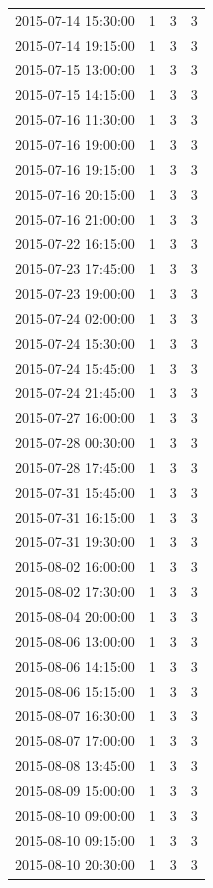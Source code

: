 \begin{tabular}{lrrr}
2015-07-14 15:30:00 & 1 & 3 & 3 \\
2015-07-14 19:15:00 & 1 & 3 & 3 \\
2015-07-15 13:00:00 & 1 & 3 & 3 \\
2015-07-15 14:15:00 & 1 & 3 & 3 \\
2015-07-16 11:30:00 & 1 & 3 & 3 \\
2015-07-16 19:00:00 & 1 & 3 & 3 \\
2015-07-16 19:15:00 & 1 & 3 & 3 \\
2015-07-16 20:15:00 & 1 & 3 & 3 \\
2015-07-16 21:00:00 & 1 & 3 & 3 \\
2015-07-22 16:15:00 & 1 & 3 & 3 \\
2015-07-23 17:45:00 & 1 & 3 & 3 \\
2015-07-23 19:00:00 & 1 & 3 & 3 \\
2015-07-24 02:00:00 & 1 & 3 & 3 \\
2015-07-24 15:30:00 & 1 & 3 & 3 \\
2015-07-24 15:45:00 & 1 & 3 & 3 \\
2015-07-24 21:45:00 & 1 & 3 & 3 \\
2015-07-27 16:00:00 & 1 & 3 & 3 \\
2015-07-28 00:30:00 & 1 & 3 & 3 \\
2015-07-28 17:45:00 & 1 & 3 & 3 \\
2015-07-31 15:45:00 & 1 & 3 & 3 \\
2015-07-31 16:15:00 & 1 & 3 & 3 \\
2015-07-31 19:30:00 & 1 & 3 & 3 \\
2015-08-02 16:00:00 & 1 & 3 & 3 \\
2015-08-02 17:30:00 & 1 & 3 & 3 \\
2015-08-04 20:00:00 & 1 & 3 & 3 \\
2015-08-06 13:00:00 & 1 & 3 & 3 \\
2015-08-06 14:15:00 & 1 & 3 & 3 \\
2015-08-06 15:15:00 & 1 & 3 & 3 \\
2015-08-07 16:30:00 & 1 & 3 & 3 \\
2015-08-07 17:00:00 & 1 & 3 & 3 \\
2015-08-08 13:45:00 & 1 & 3 & 3 \\
2015-08-09 15:00:00 & 1 & 3 & 3 \\
2015-08-10 09:00:00 & 1 & 3 & 3 \\
2015-08-10 09:15:00 & 1 & 3 & 3 \\
2015-08-10 20:30:00 & 1 & 3 & 3 \\

\end{tabular}
